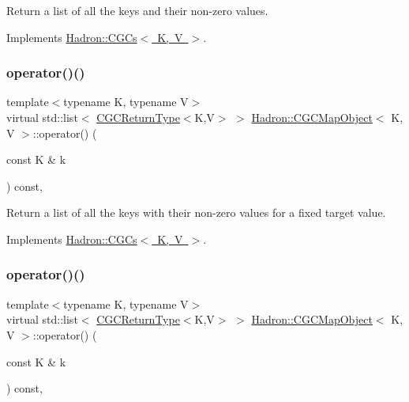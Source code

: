 Return a list of all the keys and their non-\/zero values. 



Implements \mbox{\hyperlink{classHadron_1_1CGCs_ac709374b31c0319e82028b9d7c23e993}{Hadron\+::\+C\+G\+Cs$<$ K, V $>$}}.

\mbox{\label{classHadron_1_1CGCMapObject_aeb342dc81f17743a25b969f540db4edf}} 
\subsubsection{\texorpdfstring{operator()()}{operator()()}\hspace{0.1cm}{\footnotesize\ttfamily [4/6]}}
{\footnotesize\ttfamily template$<$typename K, typename V$>$ \\
virtual std\+::list$<$ \mbox{\hyperlink{structHadron_1_1CGCReturnType}{C\+G\+C\+Return\+Type}}$<$K,V$>$ $>$ \mbox{\hyperlink{classHadron_1_1CGCMapObject}{Hadron\+::\+C\+G\+C\+Map\+Object}}$<$ K, V $>$\+::operator() (\begin{DoxyParamCaption}\item[{const K \&}]{k }\end{DoxyParamCaption}) const\hspace{0.3cm}{\ttfamily [inline]}, {\ttfamily [virtual]}}



Return a list of all the keys with their non-\/zero values for a fixed target value. 



Implements \mbox{\hyperlink{classHadron_1_1CGCs_a8d2d80be37b603359708ebdd5923ff47}{Hadron\+::\+C\+G\+Cs$<$ K, V $>$}}.

\mbox{\label{classHadron_1_1CGCMapObject_aeb342dc81f17743a25b969f540db4edf}} 
\subsubsection{\texorpdfstring{operator()()}{operator()()}\hspace{0.1cm}{\footnotesize\ttfamily [5/6]}}
{\footnotesize\ttfamily template$<$typename K, typename V$>$ \\
virtual std\+::list$<$ \mbox{\hyperlink{structHadron_1_1CGCReturnType}{C\+G\+C\+Return\+Type}}$<$K,V$>$ $>$ \mbox{\hyperlink{classHadron_1_1CGCMapObject}{Hadron\+::\+C\+G\+C\+Map\+Object}}$<$ K, V $>$\+::operator() (\begin{DoxyParamCaption}\item[{const K \&}]{k }\end{DoxyParamCaption}) const\hspace{0.3cm}{\ttfamily [inline]}, {\ttfamily [virtual]}}



